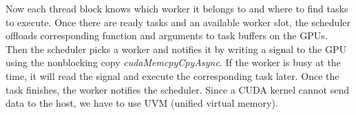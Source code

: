 Now each thread block knows which worker it belongs to and where to find tasks to execute.
Once there are ready tasks and an available worker slot, the scheduler offloads corresponding function and arguments to task buffers on the GPUs.
Then the scheduler picks a worker and notifies it by writing a signal to the GPU using the nonblocking copy {\em cudaMemcpyCpyAsync}.
If the worker is busy at the time, it will read the signal  and execute the corresponding task later.
Once the task finishes, the worker notifies the scheduler.
Since a CUDA kernel cannot send data to the host, we have to use UVM (unified virtual memory).

